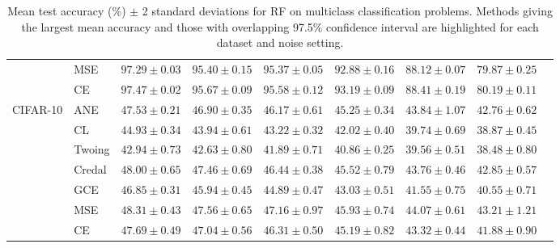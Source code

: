 \documentclass[letterpaper]{article} %
\begin{document}
\begin{table}[t]
\begin{tabular}{clccccccc}
 & MSE    & $97.29 \pm 0.03$ & $95.40 \pm 0.15$ & $95.37 \pm 0.05$ & $92.88 \pm 0.16$ & $88.12 \pm 0.07$ & $79.87 \pm 0.25$ \\ 
 & CE     & $\mathbf{97.47 \pm 0.02}$ & $95.67 \pm 0.09$ & $\mathbf{95.58 \pm 0.12}$ & $93.19 \pm 0.09$ & $88.41 \pm 0.19$ & $80.19 \pm 0.11$ \\ 
\hline
\multirow{7}{*}{CIFAR-10}
 & ANE    & $47.53 \pm 0.21$ & $\mathbf{46.90 \pm 0.35}$ & $\mathbf{46.17 \pm 0.61}$ & $\mathbf{45.25 \pm 0.34}$ & $\mathbf{43.84 \pm 1.07}$ & $\mathbf{42.76 \pm 0.62}$ \\ 
 & CL     & $44.93 \pm 0.34$ & $43.94 \pm 0.61$ & $43.22 \pm 0.32$ & $42.02 \pm 0.40$ & $39.74 \pm 0.69$ & $38.87 \pm 0.45$ \\ 
 & Twoing & $42.94 \pm 0.73$ & $42.63 \pm 0.80$ & $41.89 \pm 0.71$ & $40.86 \pm 0.25$ & $39.56 \pm 0.51$ & $38.48 \pm 0.80$ \\ 
 & Credal & $\mathbf{48.00 \pm 0.65}$ & $\mathbf{47.46 \pm 0.69}$ & $\mathbf{46.44 \pm 0.38}$ & $\mathbf{45.52 \pm 0.79}$ & $\mathbf{43.76 \pm 0.46}$ & $\mathbf{42.85 \pm 0.57}$ \\ 
 & GCE    & $46.85 \pm 0.31$ & $45.94 \pm 0.45$ & $44.89 \pm 0.47$ & $43.03 \pm 0.51$ & $41.55 \pm 0.75$ & $40.55 \pm 0.71$ \\ 
 & MSE    & $\mathbf{48.31 \pm 0.43}$ & $\mathbf{47.56 \pm 0.65}$ & $\mathbf{47.16 \pm 0.97}$ & $\mathbf{45.93 \pm 0.74}$ & $\mathbf{44.07 \pm 0.61}$ & $\mathbf{43.21 \pm 1.21}$ \\ 
 & CE     & $\mathbf{47.69 \pm 0.49}$ & $\mathbf{47.04 \pm 0.56}$ & $\mathbf{46.31 \pm 0.50}$ & $\mathbf{45.19 \pm 0.82}$ & $\mathbf{43.32 \pm 0.44}$ & $\mathbf{41.88 \pm 0.90}$ \\ 
\hline
\end{tabular} 
\caption{Mean test accuracy (\%) $\pm$ 2 standard deviations for RF on multiclass classification problems. Methods giving the largest mean accuracy and those with overlapping 97.5\% confidence interval are highlighted for each dataset and noise setting.} 
\label{tab:rf-mc}
\end{table} 



\end{document}
